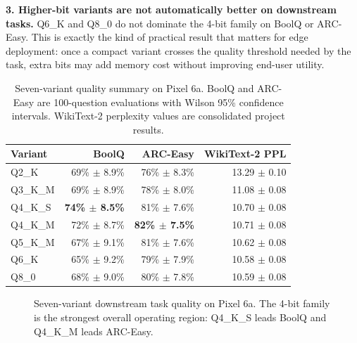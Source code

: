 \documentclass{article}
\begin{document}
\textbf{3. Higher-bit variants are not automatically better on downstream tasks.} Q6\_K and Q8\_0 do not dominate the 4-bit family on BoolQ or ARC-Easy. This is exactly the kind of practical result that matters for edge deployment: once a compact variant crosses the quality threshold needed by the task, extra bits may add memory cost without improving end-user utility.

\begin{table}[t]
\centering
\caption{Seven-variant quality summary on Pixel 6a. BoolQ and ARC-Easy are 100-question evaluations with Wilson 95\% confidence intervals. WikiText-2 perplexity values are consolidated project results.}
\label{tab:quality}
\small
\begin{tabular}{lrrr}
\toprule
\textbf{Variant} & \textbf{BoolQ} & \textbf{ARC-Easy} & \textbf{WikiText-2 PPL} \\
\midrule
Q2\_K    & 69\% $\pm$ 8.9\% & 76\% $\pm$ 8.3\% & 13.29 $\pm$ 0.10 \\
Q3\_K\_M & 69\% $\pm$ 8.9\% & 78\% $\pm$ 8.0\% & 11.08 $\pm$ 0.08 \\
Q4\_K\_S & \textbf{74\% $\pm$ 8.5\%} & 81\% $\pm$ 7.6\% & 10.70 $\pm$ 0.08 \\
Q4\_K\_M & 72\% $\pm$ 8.7\% & \textbf{82\% $\pm$ 7.5\%} & 10.71 $\pm$ 0.08 \\
Q5\_K\_M & 67\% $\pm$ 9.1\% & 81\% $\pm$ 7.6\% & 10.62 $\pm$ 0.08 \\
Q6\_K    & 65\% $\pm$ 9.2\% & 79\% $\pm$ 7.9\% & 10.58 $\pm$ 0.08 \\
Q8\_0    & 68\% $\pm$ 9.0\% & 80\% $\pm$ 7.8\% & 10.59 $\pm$ 0.08 \\
\bottomrule
\end{tabular}
\end{table}

\begin{figure}[t]
\centering
{}
\caption{Seven-variant downstream task quality on Pixel 6a. The 4-bit family is the strongest overall operating region: Q4\_K\_S leads BoolQ and Q4\_K\_M leads ARC-Easy.}
\label{fig:quality_scores}
\end{figure}
\end{document}
